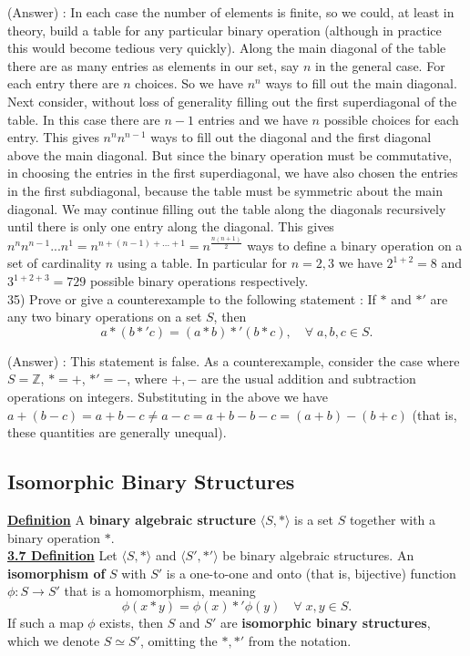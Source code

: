 \documentclass[12pt, letterpaper]{article}
\begin{document}
(Answer) : In each case the number of elements is finite, so we could, at least in theory, build a table for any particular binary operation (although in practice this would become tedious very quickly). Along the main diagonal of the table there are as many entries as elements in our set, say $n$ in the general case. For each entry there are $n$ choices. So we have $n^n$ ways to fill out the main diagonal. Next consider, without loss of generality filling out the first superdiagonal of the table. In this case there are $n-1$ entries and we have $n$ possible choices for each entry. This gives $n^nn^{n-1}$  ways to fill out the diagonal and the first diagonal above the main diagonal. But since the binary operation must be commutative, in choosing the entries in the first superdiagonal, we have also chosen the entries in the first subdiagonal, because the table must be symmetric about the main diagonal. We may continue filling out the table along the diagonals recursively until there is only one entry along the diagonal. This gives $n^nn^{n-1}...n^1 = n^{n + (n-1) + ... + 1} = n^{\frac{n(n+1)}{2}}$ ways to define a binary operation on a set of cardinality $n$ using a table. In particular for $n=2,3$ we have $2^{1+2} = 8$ and $3^{1+2+3} = 729$ possible binary operations respectively. \\

35) Prove or give a counterexample to the following statement : If $*$ and $*'$ are any two binary operations on a set $S$, then $$a*(b*'c) = (a*b)*'(b*c), \quad \forall \; a,b,c \in S.$$ 

(Answer) : This statement is false. As a counterexample, consider the case where $S = \mathbb{Z}$, $* = +$, $*' = -$, where $+,-$ are the usual addition and subtraction operations on integers. Substituting in the above we have $a+(b-c) = a+b-c \neq a-c = a+b-b-c = (a+b) - (b+c)$ (that is, these quantities are generally unequal).

\subsection{Isomorphic Binary Structures}

\underline{{\bf Definition}} A {\bf binary algebraic structure} $\langle S, *\rangle$ is a set $S$ together with a binary operation $*$. \\

\noindent \underline{{\bf 3.7 Definition}} Let $\langle S, *\rangle$ and $\langle S', *'\rangle$ be binary algebraic structures. An {\bf isomorphism of} $S$ with $S'$ is a one-to-one and onto (that is, bijective) function $\phi : S \rightarrow S'$  that is a homomorphism, meaning $$\phi(x*y) = \phi(x)*'\phi(y) \quad \forall \; x,y \in S.$$
If such a map $\phi$ exists, then $S$ and $S'$ are {\bf isomorphic binary structures}, which we denote $S \simeq S'$, omitting the $*,*'$ from the notation. \\
\end{document}
